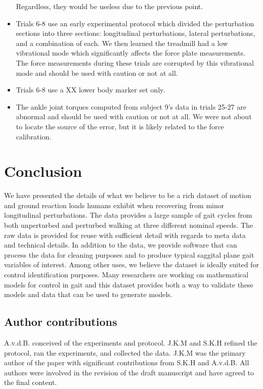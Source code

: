 \documentclass[fleqn,10pt]{wlpeerj}
\begin{document}
\begin{itemize}
    Regardless, they would be useless due to the previous point.
  \item Trials 6-8 use an early experimental protocol which divided the
    perturbation sections into three sections: longitudinal perturbations,
    lateral perturbations, and a combination of each. We then learned the
    treadmill had a low vibrational mode which significantly affects the force
    plate measurements. The force measurements during these trials are
    corrupted by this vibrational mode and should be used with caution or not
    at all.
  \item Trials 6-8 use a XX lower body marker set only.
  \item The ankle joint torques computed from subject 9's data in trials 25-27
    are abnormal and should be used with caution or not at all. We were not
    about to locate the source of the error, but it is likely related to the
    force calibration.
\end{itemize}

\section*{Conclusion}

We have presented the details of what we believe to be a rich dataset of motion
and ground reaction loads humans exhibit when recovering from minor
longitudinal perturbations. The data provides a large sample of gait cycles
from both unperturbed and perturbed walking at three different nominal speeds.
The raw data is provided for reuse with sufficient detail with regards to meta
data and technical details. In addition to the data, we provide software that
can process the data for cleaning purposes and to produce typical saggital
plane gait variables of interest. Among other uses, we believe the dataset is
ideally suited for control identification purposes. Many researchers are
working on mathematical models for control in gait and this dataset provides
both a way to validate these models and data that can be used to generate
models.

\subsection*{Author contributions}
A.v.d.B. conceived of the experiments and protocol. J.K.M and S.K.H refined the
protocol, ran the experiments, and collected the data. J.K.M was the primary
author of the paper with significant contributions from S.K.H and A.v.d.B. All
authors were involved in the revision of the draft manuscript and have agreed
to the final content.
\end{document}
